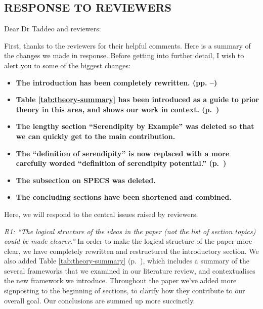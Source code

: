 

\subsection*{RESPONSE TO REVIEWERS}

Dear Dr Taddeo and reviewers:

First, thanks to the reviewers for their helpful comments.  Here is a
summary of the changes we made in response.  Before getting into
further detail, I wish to alert you to some of the biggest changes:
\begin{itemize}
\item \textbf{The introduction has been completely rewritten. (pp. \pageref{sec:introduction}--\pageref{sec:contributions})} 
\item \textbf{Table \ref{tab:theory-summary} has been introduced as a guide to prior theory in this area, and shows our work in context. (p.~\pageref{tab:theory-summary})}
\item \textbf{The lengthy section ``Serendipity by Example'' was deleted so that we can quickly get to the main contribution.}
\item \textbf{The ``definition of serendipity'' is now replaced with a more carefully worded ``definition of serendipity potential.'' (p.~\pageref{def:serendipity})} 
\item \textbf{The subsection on SPECS was deleted.}
\item \textbf{The concluding sections have been shortened and combined.}
\end{itemize}

\noindent Here, we will respond to the central issues raised by reviewers.

\medskip

\emph{R1: ``The logical structure of the ideas in the paper (not the
  list of section topics) could be made clearer.''}  In order to make
the logical structure of the paper more clear, we have completely
rewritten and restructured the introductory section.  We also
added Table \ref{tab:theory-summary}
(p.~\pageref{tab:theory-summary}), which includes a summary
of the several frameworks that we examined in our literature review, and
contextualises the new framework we introduce.
Throughout the paper we've added more signposting to the beginning of
sections, to clarify how they contribute to our overall goal.  Our
conclusions are summed up more succinctly.

